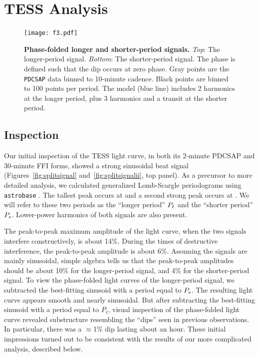 \documentclass[12pt,twocolumn,tighten]{aastex62}
\begin{document}
\section{TESS Analysis}
\label{sec:tess}

\begin{figure}[t]
	\begin{center}
		\leavevmode
		\texttt{[image: f3.pdf]}
	\end{center}
	\vspace{-0.7cm}
	\caption{ {\bf Phase-folded longer and shorter-period signals.}
    {\it Top}: The longer-period signal.  {\it Bottom}: The
    shorter-period signal. The phase is defined such that the dip
    occurs at zero phase.  Gray points are the \texttt{PDCSAP} data
    binned to 10-minute cadence.  Black points are binned to 100
    points per period.  The model (blue line) includes 2 harmonics at
    the longer period, plus 3 harmonics and a transit at the shorter
    period.
		\label{fig:phasefold}
	}
\end{figure}

\subsection{Inspection}

Our initial inspection of the TESS light curve, in both its 2-minute
PDCSAP and 30-minute FFI forms, showed a strong sinusoidal beat signal
(Figures~\ref{fig:splitsignal} and~\ref{fig:splitsignalii}, top
panel). As a precursor to more detailed analysis, we calculated
generalized Lomb-Scargle periodograms using \texttt{astrobase}
\citep{lomb_1976,scargle_studies_1982,vanderplas_periodograms_2015,bhatti_astrobase_2018}.
The tallest peak occurs at  and a second strong peak occurs at
. We will refer to these
two periods as the ``longer period'' $P_{\rm \ell}$ and the ``shorter
period'' $P_{\rm s}$.  Lower-power harmonics of both signals are also
present.

The peak-to-peak maximum amplitude of the light curve, when the two
signals interfere constructively, is about 14\%.  During the times of
destructive interference, the peak-to-peak amplitude is about 6\%.
Assuming the signals are mainly sinusoidal, simple algebra tells us
that the peak-to-peak amplitudes should be about 10\% for the
longer-period signal, and 4\% for the shorter-period signal.  To view
the phase-folded light curves of the longer-period signal, we
subtracted the best-fitting sinusoid with a period equal to $P_{\rm
s}$. The resulting light curve appears smooth and nearly sinusoidal.
But after subtracting the best-fitting sinusoid with a period equal to
$P_{\ell}$, visual inspection of the phase-folded light curve revealed
substructure resembling the ``dips'' seen in previous observations. In
particular, there was a $\approx$1\% dip lasting about an hour.  These
initial impressions turned out to be consistent with the results of
our more complicated analysis, described below.
\end{document}
